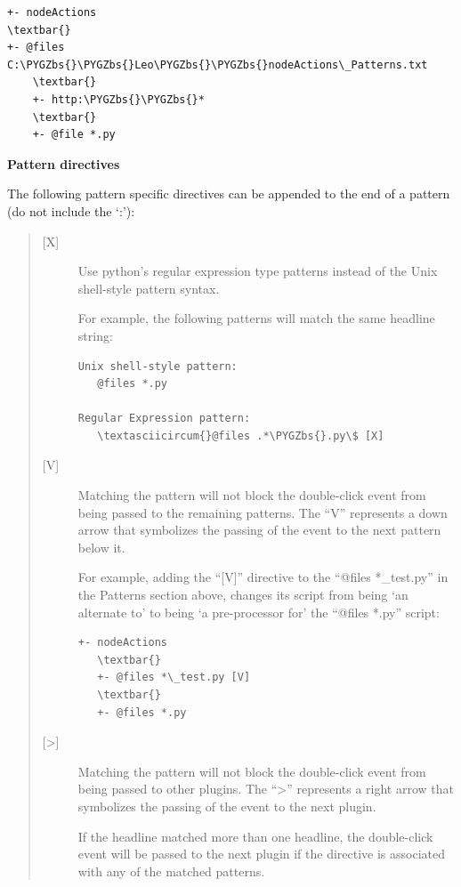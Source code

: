 \documentclass[a4paper,10pt,english]{sphinxmanual}
\def\PYGZbs{\char`\\}
\begin{document}
\begin{Verbatim}[commandchars=\\\{\}]
+- nodeActions
\textbar{}
+- @files C:\PYGZbs{}\PYGZbs{}Leo\PYGZbs{}\PYGZbs{}nodeActions\_Patterns.txt
    \textbar{}
    +- http:\PYGZbs{}\PYGZbs{}*
    \textbar{}
    +- @file *.py
\end{Verbatim}

\textbf{Pattern directives}

The following pattern specific directives can be appended to the end of a
pattern (do not include the `:'):
\begin{quote}\begin{description}
\item[{{[}X{]}}] \leavevmode
Use python's regular expression type patterns instead of the Unix
shell-style pattern syntax.

For example, the following patterns will match the same headline string:

\begin{Verbatim}[commandchars=\\\{\}]
Unix shell-style pattern:
   @files *.py

Regular Expression pattern:
   \textasciicircum{}@files .*\PYGZbs{}.py\$ [X]
\end{Verbatim}

\item[{{[}V{]}}] \leavevmode
Matching the pattern will not block the double-click event from
being passed to the remaining patterns.
The ``V'' represents a down arrow that symbolizes the passing of the event
to the next pattern below it.

For example, adding the ``{[}V{]}'' directive to the ``@files *\_test.py'' in
the Patterns section above, changes its script from being `an
alternate to' to being `a pre-processor for' the ``@files *.py'' script:

\begin{Verbatim}[commandchars=\\\{\}]
+- nodeActions
   \textbar{}
   +- @files *\_test.py [V]
   \textbar{}
   +- @files *.py
\end{Verbatim}

\item[{{[}\textgreater{}{]}}] \leavevmode
Matching the pattern will not block the double-click event from being
passed to other plugins.
The ``\textgreater{}'' represents a right arrow that
symbolizes the passing of the event to the next plugin.

If the headline matched more than one headline,
the double-click event will be passed to the next plugin if the
directive is associated with any of the matched patterns.

\end{description}\end{quote}
\end{document}
